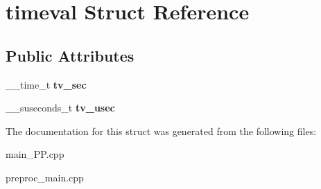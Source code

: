 \hypertarget{structtimeval}{\section{timeval Struct Reference}
\label{structtimeval}
}
\subsection*{Public Attributes}
\begin{DoxyCompactItemize}
\item 
\hypertarget{structtimeval_a33c19839180ed049b0419f680f5c37ad}{\+\_\+\+\_\+time\+\_\+t {\bfseries tv\+\_\+sec}}\label{structtimeval_a33c19839180ed049b0419f680f5c37ad}

\item 
\hypertarget{structtimeval_a6792d43e50db57fb38f7b31d48d105ad}{\+\_\+\+\_\+suseconds\+\_\+t {\bfseries tv\+\_\+usec}}\label{structtimeval_a6792d43e50db57fb38f7b31d48d105ad}

\end{DoxyCompactItemize}


The documentation for this struct was generated from the following files\+:\begin{DoxyCompactItemize}
\item 
main\+\_\+\+P\+P.\+cpp\item 
preproc\+\_\+main.\+cpp\end{DoxyCompactItemize}
